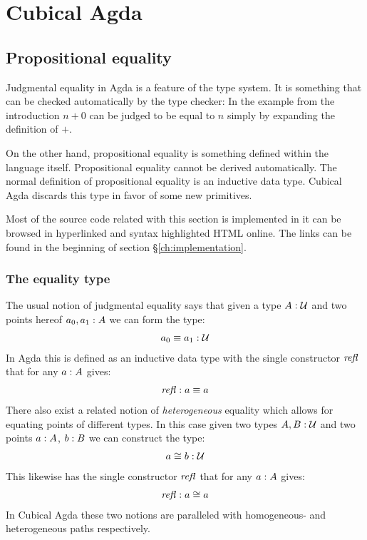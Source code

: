 \chapter{Cubical Agda}
\section{Propositional equality}
Judgmental equality in Agda is a feature of the type system. It is
something that can be checked automatically by the type checker: In
the example from the introduction $n + 0$ can be judged to be equal to
$n$ simply by expanding the definition of $+$.

On the other hand, propositional equality is something defined within
the language itself. Propositional equality cannot be derived
automatically. The normal definition of propositional equality is an
inductive data type. Cubical Agda discards this type in favor of some
new primitives.

Most of the source code related with this section is implemented in
\cite{cubical-demo} it can be browsed in hyperlinked and syntax
highlighted HTML online. The links can be found in the beginning of
section \S\ref{ch:implementation}.

\subsection{The equality type}
The usual notion of judgmental equality says that given a type $A \mathrel{:}
\mathcal{U}$ and two points hereof $a_0, a_1 \mathrel{:} A$ we can form the type:
%
\begin{align}
  a_0 \equiv a_1 \mathrel{:} \mathcal{U}
\end{align}
%
In Agda this is defined as an inductive data type with the single
constructor $\refl$ that for any $a \mathrel{:} A$ gives:
%
\begin{align}
  \refl \tp a \equiv a
\end{align}
%
There also exist a related notion of \emph{heterogeneous} equality which allows
for equating points of different types. In this case given two types $A, B \mathrel{:}
\mathcal{U}$ and two points $a \mathrel{:} A$, $b \mathrel{:} B$ we can construct the type:
%
\begin{align}
  a \cong b \mathrel{:} \mathcal{U}
\end{align}
%
This likewise has the single constructor $\refl$ that for any $a \mathrel{:}
A$ gives:
%
\begin{align}
  \refl \tp a \cong a
\end{align}
%
In Cubical Agda these two notions are paralleled with homogeneous- and
heterogeneous paths respectively.
%

